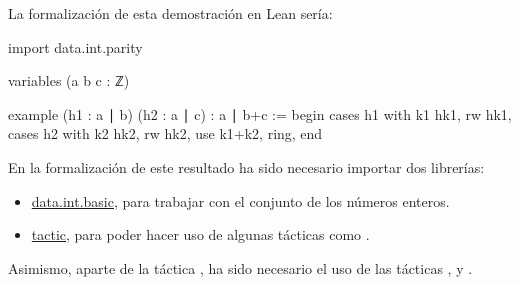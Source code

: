 La formalización de esta demostración en Lean sería:
\begin{leancode}
import data.int.parity

variables (a b c : ℤ)

example
  (h1 : a ∣ b)
  (h2 : a ∣ c)
  : a ∣ b+c :=
begin
  cases h1 with k1 hk1,
  rw hk1,
  cases h2 with k2 hk2,
  rw hk2,
  use k1+k2,
  ring,
end
\end{leancode}

En la formalización de este resultado ha sido necesario importar dos librerías:
\begin{itemize}
\item \href{https://github.com/leanprover-community/mathlib/blob/master/src/data/int/basic.lean}{data.int.basic},
  para trabajar con el conjunto de los números enteros.

\item \href{https://github.com/leanprover-community/mathlib/tree/master/src/tactic}{tactic},
  para poder hacer uso de algunas tácticas como .
\end{itemize}

Asimismo, aparte de la táctica , ha sido necesario el uso
de las tácticas
,
 y
.

